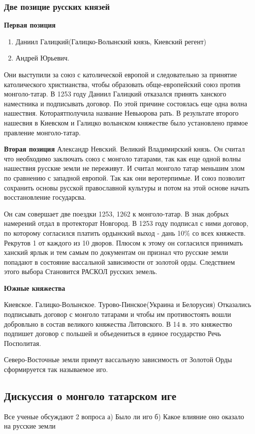 \documentclass[a4paper]{article}
\begin{document}
\subsubsection{Две позицие русских князей}
\textbf{Первая позиция}

\begin{enumerate}
    \item Даниил Галицкий(Галицко-Волынский князь, Киевский регент)
    \item Андрей Юрьевич.       
\end{enumerate}

Они выступили за союз с католической европой и следовательно за принятие католического христианства, чтобы образовать обще-европейский союз против монголо-татар. В 1253 году Даниил Галицкий отказался принять ханского наместника и подписывать договор. По этой причине состоялась еще одна волна нашествия. Котораятполучила название Невьюрова рать.
В результате второго нашесвия в Киевском и Галицко волынском княжестве было установлено прямое правление монголо-татар.


\textbf{Вторая позиция}
Александр Невский. Великий Владимирский князь. Он считал что необходимо заключать союз с монголо татарами, так как еще одной волны нашествия русские земли не переживут. И считал монголо татар меньшим злом по сравнению с западной европой. Так как они веротерпимые. И союз позволит сохранить основы русской православной культуры и потом на этой основе начать восстановление государсва. 

Он сам совершает две поездки 1253, 1262 к монголо-татар. В знак добрых намерений отдал в протекторат Новгород.
В 1253 году подписал с ними договор, по которому согласился платить ордынский выход - дань 10\% со всех княжеств. Рекрутов 1 от каждого из 10 дворов. Плюсом к этому он согласился принимать ханский ярлык и тем самым по документам он признал что русские земли попадают в состояние вассальной зависимости от золотой орды. Следствием этого выбора Становится РАСКОЛ русских 
земель.

\textbf{Южные княжества}
\begin{enumerate}
    
\end{enumerate}
Киевское. 
Галицко-Волынское.
Турово-Пинское(Украина и Белорусия)
Отказались подписывать договор с монголо татарами и чтобы им противостоять вошли добровльно в состав великого княжества Литовского.
В 14 в. это княжество подпишет договор с польшей и объедениться в единое государство Речь Посполитая.

Северо-Восточные земли примут вассальную зависимость от Золотой Орды сформируется так называемое иго.

\subsection{Дискуссия о монголо татарском иге}
Все ученые обсуждают 2 вопроса
а) Было ли иго
б) Какое влияние оно оказало на русские земли
\end{document}
